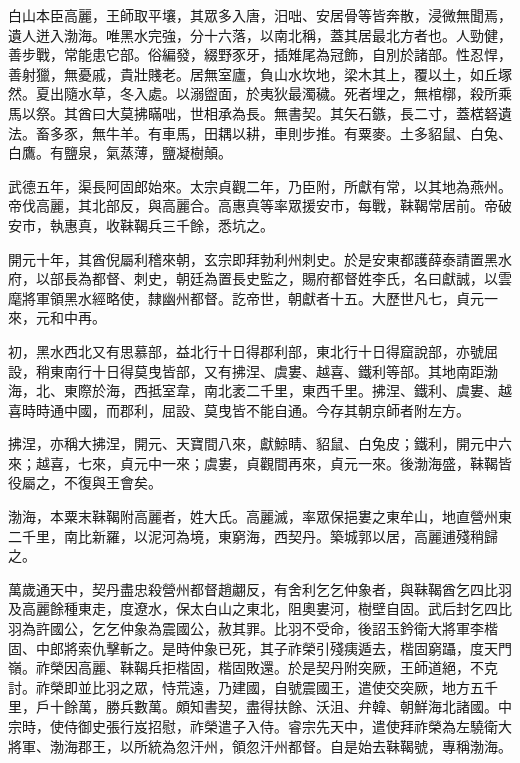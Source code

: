 \begin{pinyinscope}
 白山本臣高麗，王師取平壤，其眾多入唐，汨咄、安居骨等皆奔散，浸微無聞焉，遺人迸入渤海。唯黑水完強，分十六落，以南北稱，蓋其居最北方者也。人勁健，善步戰，常能患它部。俗編發，綴野豕牙，插雉尾為冠飾，自別於諸部。性忍悍，善射獵，無憂戚，貴壯賤老。居無室廬，負山水坎地，梁木其上，覆以土，如丘塚然。夏出隨水草，冬入處。以溺盥面，於夷狄最濁穢。死者埋之，無棺槨，殺所乘馬以祭。其酋曰大莫拂瞞咄，世相承為長。無書契。其矢石鏃，長二寸，蓋楛砮遺法。畜多豕，無牛羊。有車馬，田耦以耕，車則步推。有粟麥。土多貂鼠、白兔、白鷹。有鹽泉，氣蒸薄，鹽凝樹顛。



 武德五年，渠長阿固郎始來。太宗貞觀二年，乃臣附，所獻有常，以其地為燕州。帝伐高麗，其北部反，與高麗合。高惠真等率眾援安市，每戰，靺鞨常居前。帝破安市，執惠真，收靺鞨兵三千餘，悉坑之。



 開元十年，其酋倪屬利稽來朝，玄宗即拜勃利州刺史。於是安東都護薛泰請置黑水府，以部長為都督、刺史，朝廷為置長史監之，賜府都督姓李氏，名曰獻誠，以雲麾將軍領黑水經略使，隸幽州都督。訖帝世，朝獻者十五。大歷世凡七，貞元一來，元和中再。



 初，黑水西北又有思慕部，益北行十日得郡利部，東北行十日得窟說部，亦號屈設，稍東南行十日得莫曳皆部，又有拂涅、虞婁、越喜、鐵利等部。其地南距渤海，北、東際於海，西抵室韋，南北袤二千里，東西千里。拂涅、鐵利、虞婁、越喜時時通中國，而郡利，屈設、莫曳皆不能自通。今存其朝京師者附左方。



 拂涅，亦稱大拂涅，開元、天寶間八來，獻鯨睛、貂鼠、白兔皮；鐵利，開元中六來；越喜，七來，貞元中一來；虞婁，貞觀間再來，貞元一來。後渤海盛，靺鞨皆役屬之，不復與王會矣。



 渤海，本粟末靺鞨附高麗者，姓大氏。高麗滅，率眾保挹婁之東牟山，地直營州東二千里，南比新羅，以泥河為境，東窮海，西契丹。築城郭以居，高麗逋殘稍歸之。



 萬歲通天中，契丹盡忠殺營州都督趙翽反，有舍利乞乞仲象者，與靺鞨酋乞四比羽及高麗餘種東走，度遼水，保太白山之東北，阻奧婁河，樹壁自固。武后封乞四比羽為許國公，乞乞仲象為震國公，赦其罪。比羽不受命，後詔玉鈐衛大將軍李楷固、中郎將索仇擊斬之。是時仲象已死，其子祚榮引殘痍遁去，楷固窮躡，度天門嶺。祚榮因高麗、靺鞨兵拒楷固，楷固敗還。於是契丹附突厥，王師道絕，不克討。祚榮即並比羽之眾，恃荒遠，乃建國，自號震國王，遣使交突厥，地方五千里，戶十餘萬，勝兵數萬。頗知書契，盡得扶餘、沃沮、弁韓、朝鮮海北諸國。中宗時，使侍御史張行岌招慰，祚榮遣子入侍。睿宗先天中，遣使拜祚榮為左驍衛大將軍、渤海郡王，以所統為忽汗州，領忽汗州都督。自是始去靺鞨號，專稱渤海。




\end{pinyinscope}
